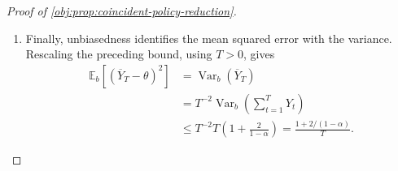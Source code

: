 \documentclass[11pt]{article}
\begin{document}
\begin{proof}[Proof of \cref{obj:prop:coincident-policy-reduction}]
\begin{enumerate}
To bound each covariance row, first use the finite geometric identity
\[
(1-\alpha)\sum_{\ell=0}^{T-1}\alpha^\ell
=
1-\alpha^T
\leq1,
\qquad
\sum_{\ell=0}^{T-1}\alpha^\ell
\leq\frac1{1-\alpha}.
\]
Here \(\ell\) is a nonnegative integer exponent. For fixed \(t\), the exponent maps \(u\mapsto t-u-1\) on \(1\leq u<t\) and \(u\mapsto u-t-1\) on \(t<u\leq T\) are injective and take values in \(\{0,\ldots,T-1\}\). Because all powers of \(\alpha\) are nonnegative, symmetry of covariance gives
\[
\begin{aligned}
\sum_{u=1}^{t-1}\operatorname{Cov}_b(Y_t,Y_u)
&=
\sum_{u=1}^{t-1}\operatorname{Cov}_b(Y_u,Y_t)
\leq
\sum_{u=1}^{t-1}\alpha^{t-u-1}
\leq
\sum_{\ell=0}^{T-1}\alpha^\ell
\leq\frac1{1-\alpha},\\
\sum_{u=t+1}^{T}\operatorname{Cov}_b(Y_t,Y_u)
&\leq
\sum_{u=t+1}^{T}\alpha^{u-t-1}
\leq
\sum_{\ell=0}^{T-1}\alpha^\ell
\leq\frac1{1-\alpha}.
\end{aligned}
\]
These inequalities include the empty past or future ranges at the endpoints. Splitting the row into its diagonal, past, and future parts now yields
\[
\begin{aligned}
\sum_{u=1}^{T}\operatorname{Cov}_b(Y_t,Y_u)
&=
\operatorname{Cov}_b(Y_t,Y_t)
+\sum_{u=1}^{t-1}\operatorname{Cov}_b(Y_t,Y_u)
+\sum_{u=t+1}^{T}\operatorname{Cov}_b(Y_t,Y_u)\\
&\leq1+\frac2{1-\alpha}.
\end{aligned}
\]
Summing over \(t\) proves
\[
\operatorname{Var}_b\!\left(\sum_{t=1}^{T}Y_t\right)
\leq
T\left(1+\frac2{1-\alpha}\right).
\]

\item Finally, unbiasedness identifies the mean squared error with the variance. Rescaling the preceding bound, using \(T>0\), gives
\[
\begin{aligned}
\mathbb E_b\!\left[(\overline Y_T-\theta)^2\right]
&=
\operatorname{Var}_b(\overline Y_T)\\
&=
T^{-2}\operatorname{Var}_b\!\left(\sum_{t=1}^{T}Y_t\right)\\
&\leq
T^{-2}T\left(1+\frac2{1-\alpha}\right)
=
\frac{1+2/(1-\alpha)}{T}.
\end{aligned}
\]
\end{enumerate}
\end{proof}
\end{document}
